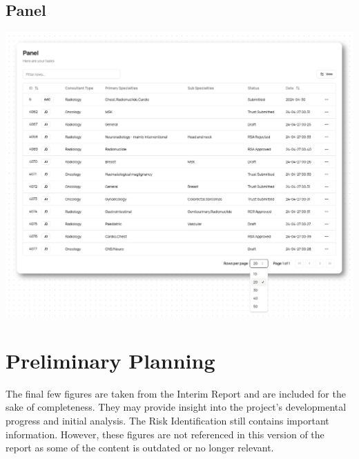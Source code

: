 \begin{appendices}
{\section{Panel} \label{app:Panel}
\includegraphics[width=\textwidth]{images/panel.png}
}

\chapter{Preliminary Planning}
The final few figures are taken from the Interim Report and are included for the sake of completeness. They may provide insight into the project's developmental progress and initial analysis. The Risk Identification still contains important information. However, these figures are not referenced in this version of the report as some of the content is outdated or no longer relevant.
\vspace{-10pt}

\end{appendices}
